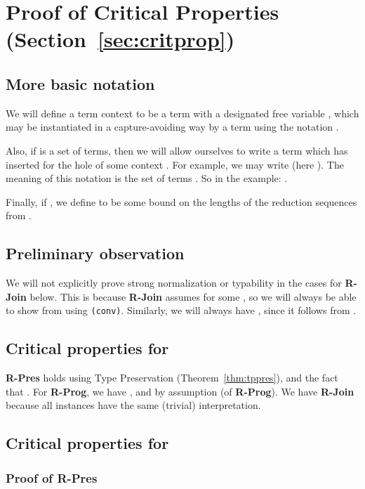 \documentclass[copyright]{eptcs}
\begin{document}
\section{Proof of Critical Properties (Section~\ref{sec:critprop})}

\subsection{More basic notation}

We will define a term context to be a term  with a designated free
variable , which may be instantiated in a capture-avoiding way by a
term  using the notation .  

Also, if  is a set of terms, then we will allow ourselves to write
a term which has  inserted for the hole of some context .  For
example, we may write  (here ).  The meaning of this notation is the set of terms
.  So in the example: .  

Finally, if , we define  to be some bound on the
lengths of the reduction sequences from .

\subsection{Preliminary observation}

We will not explicitly prove strong normalization or typability in the
cases for \textbf{R-Join} below.  This is because \textbf{R-Join}
assumes  for some , so we will always
be able to show  from  using \texttt{(conv)}.  Similarly, we will always have
, since it follows from .

\subsection{Critical properties for }

\textbf{R-Pres} holds using Type Preservation
(Theorem~\ref{thm:tppres}), and the fact that .  For \textbf{R-Prog}, we have , and  by assumption (of
\textbf{R-Prog}). We have \textbf{R-Join} because all instances
 have the same (trivial) interpretation.

\subsection{Critical properties for }

\subsubsection{Proof of \textbf{R-Pres}}
\end{document}
